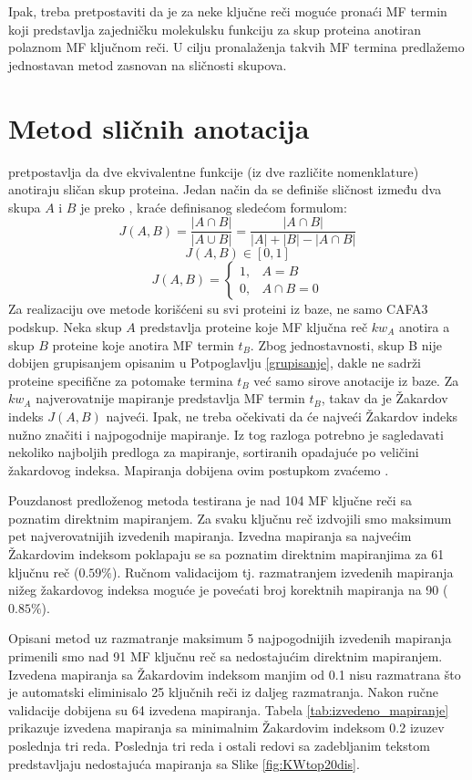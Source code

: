 Ipak, treba pretpostaviti da je za neke ključne reči moguće pronaći MF termin
koji predstavlja zajedničku molekulsku funkciju za skup proteina anotiran
polaznom MF ključnom reči.  U cilju pronalaženja takvih MF termina predlažemo
jednostavan metod zasnovan na sličnosti skupova.

\section{Metod sličnih anotacija}

 pretpostavlja da dve ekvivalentne funkcije (iz dve
različite nomenklature) anotiraju sličan skup proteina.  Jedan način da se
definiše sličnost između dva skupa $A$ i $B$ je preko 
, kraće   definisanog sledećom formulom:
$$J(A,B) = \dfrac{|A \cap B|}{|A \cup B|} =  \dfrac{|A \cap B|}{|A|+|B|-|A \cap B|}$$
$$  J(A,B) \in [0, 1] $$
\[   
  J(A,B) = 
    \begin{cases}
      1,&A=B  \\
      0,&A\cap B=0
    \end{cases}
\]
Za realizaciju ove metode korišćeni su svi proteini iz \swissprot baze, ne samo
CAFA3 podskup.  Neka skup $A$ predstavlja proteine koje MF ključna reč $kw_A$
anotira a skup $B$ proteine koje anotira MF termin $t_B$.  Zbog jednostavnosti,
skup B nije dobijen grupisanjem opisanim u Potpoglavlju \ref{grupisanje}, dakle ne sadrži proteine specifične za potomake termina $t_B$ već samo
sirove anotacije iz \swissprot baze.  Za $kw_A$ najverovatnije
mapiranje predstavlja MF termin $t_B$, takav da je Žakardov indeks $J(A,B)$
najveći. Ipak, ne treba očekivati da će najveći Žakardov indeks nužno značiti i
najpogodnije mapiranje. Iz tog razloga potrebno je  sagledavati nekoliko
najboljih predloga za mapiranje, sortiranih opadajuće po veličini žakardovog
indeksa. Mapiranja dobijena ovim postupkom zvaćemo .

Pouzdanost predloženog metoda testirana je nad 104 MF ključne reči sa poznatim
direktnim mapiranjem.  Za svaku ključnu reč izdvojili smo maksimum pet
najverovatnijih izvedenih mapiranja. Izvedna mapiranja sa najvećim Žakardovim
indeksom poklapaju se sa poznatim direktnim mapiranjima za 61 ključnu reč
($0.59\%$). Ručnom validacijom tj. razmatranjem izvedenih mapiranja nižeg
žakardovog indeksa moguće je povećati broj korektnih mapiranja na 90
($0.85\%$).

Opisani metod uz razmatranje maksimum 5 najpogodnijih izvedenih mapiranja
primenili smo nad 91 MF ključnu reč sa nedostajućim direktnim mapiranjem.
Izvedena mapiranja sa Žakardovim indeksom manjim od 0.1 nisu razmatrana što je
automatski eliminisalo 25 ključnih reči iz daljeg razmatranja. Nakon ručne
validacije dobijena su 64 izvedena mapiranja.  Tabela
\ref{tab:izvedeno_mapiranje} prikazuje izvedena mapiranja sa minimalnim
Žakardovim indeksom 0.2 izuzev poslednja tri reda. Poslednja tri reda i
ostali redovi sa zadebljanim tekstom  predstavljaju nedostajuća
mapiranja sa Slike \ref{fig:KWtop20dis}.


